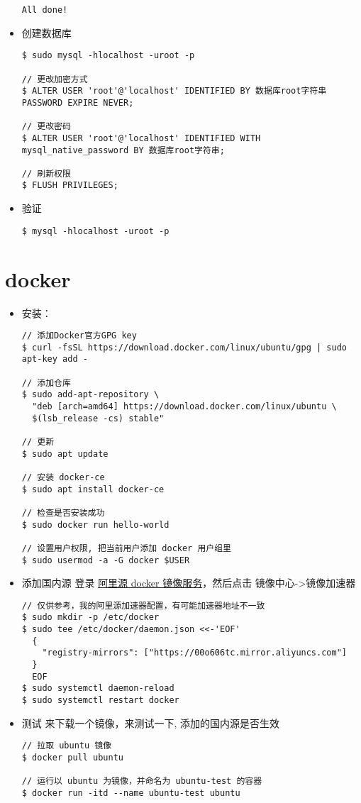 \begin{itemize}
\begin{lstlisting}
All done! 
\end{lstlisting}

\item 创建数据库
\begin{lstlisting}
$ sudo mysql -hlocalhost -uroot -p

// 更改加密方式
$ ALTER USER 'root'@'localhost' IDENTIFIED BY 数据库root字符串 PASSWORD EXPIRE NEVER;

// 更改密码
$ ALTER USER 'root'@'localhost' IDENTIFIED WITH mysql_native_password BY 数据库root字符串;

// 刷新权限
$ FLUSH PRIVILEGES;
\end{lstlisting}

\item 验证
\begin{lstlisting}
$ mysql -hlocalhost -uroot -p
\end{lstlisting}
\end{itemize}


\section{docker}

\begin{itemize}
\item 安装：
\begin{lstlisting}
// 添加Docker官方GPG key
$ curl -fsSL https://download.docker.com/linux/ubuntu/gpg | sudo apt-key add -

// 添加仓库
$ sudo add-apt-repository \
  "deb [arch=amd64] https://download.docker.com/linux/ubuntu \
  $(lsb_release -cs) stable"

// 更新 
$ sudo apt update

// 安装 docker-ce 
$ sudo apt install docker-ce

// 检查是否安装成功 
$ sudo docker run hello-world

// 设置用户权限, 把当前用户添加 docker 用户组里
$ sudo usermod -a -G docker $USER

\end{lstlisting}

\item 添加国内源 
登录 \href{https://cr.console.aliyun.com/cn-hangzhou/instances/mirrors}{阿里源 docker 镜像服务}，然后点击 镜像中心->镜像加速器
\begin{lstlisting}
// 仅供参考，我的阿里源加速器配置，有可能加速器地址不一致
$ sudo mkdir -p /etc/docker
$ sudo tee /etc/docker/daemon.json <<-'EOF'
  {
    "registry-mirrors": ["https://00o606tc.mirror.aliyuncs.com"]
  }
  EOF
$ sudo systemctl daemon-reload
$ sudo systemctl restart docker
\end{lstlisting}

\item 测试
来下载一个镜像，来测试一下, 添加的国内源是否生效
\begin{lstlisting}
// 拉取 ubuntu 镜像
$ docker pull ubuntu

// 运行以 ubuntu 为镜像，并命名为 ubuntu-test 的容器 
$ docker run -itd --name ubuntu-test ubuntu
\end{lstlisting}
\end{itemize}

